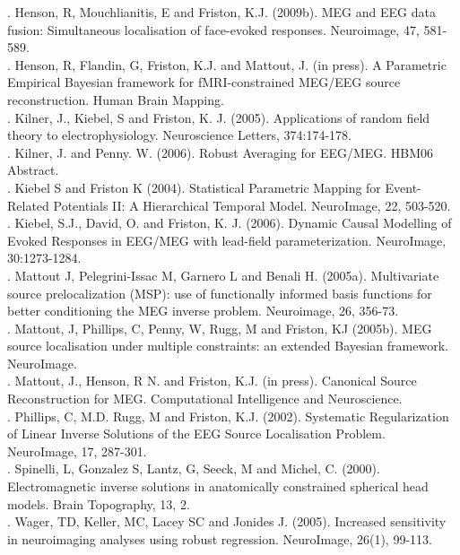 . Henson, R, Mouchlianitis, E and Friston, K.J. (2009b). MEG and EEG data fusion: Simultaneous localisation of face-evoked responses. Neuroimage, 47, 581-589.\\

. Henson, R, Flandin, G, Friston, K.J. and Mattout, J. (in press). A Parametric Empirical Bayesian framework for fMRI-constrained MEG/EEG source reconstruction. Human Brain Mapping.\\

. Kilner, J., Kiebel, S and Friston, K. J. (2005). Applications of random field theory to electrophysiology. Neuroscience Letters, 374:174-178.\\

. Kilner, J. and Penny. W. (2006). Robust Averaging for EEG/MEG. HBM06 Abstract.\\

. Kiebel S and Friston K (2004). Statistical Parametric Mapping for Event-Related Potentials II: A Hierarchical Temporal Model. NeuroImage, 22, 503-520.\\

. Kiebel, S.J., David, O. and Friston, K. J. (2006). Dynamic Causal Modelling of Evoked Responses in EEG/MEG with lead-field parameterization. NeuroImage, 30:1273-1284.\\

. Mattout J, Pelegrini-Issac M, Garnero L and Benali H. (2005a). Multivariate source prelocalization (MSP): use of functionally informed basis functions for better conditioning the MEG inverse problem. Neuroimage, 26, 356-73.\\

. Mattout, J, Phillips, C, Penny, W, Rugg, M and Friston, KJ (2005b). MEG source localisation under multiple constraints: an extended Bayesian framework. NeuroImage.\\

. Mattout, J., Henson, R N. and Friston, K.J. (in press). Canonical Source Reconstruction for MEG. Computational Intelligence and Neuroscience.\\

. Phillips, C, M.D. Rugg, M and Friston, K.J. (2002). Systematic Regularization of Linear Inverse Solutions of the EEG Source Localisation Problem. NeuroImage, 17, 287-301.\\

. Spinelli, L, Gonzalez S, Lantz, G, Seeck, M and Michel, C. (2000). Electromagnetic inverse solutions in anatomically constrained spherical head models. Brain Topography, 13, 2.\\

. Wager, TD, Keller, MC, Lacey SC and Jonides J. (2005). Increased sensitivity in neuroimaging analyses using robust regression. NeuroImage, 26(1), 99-113.\\
